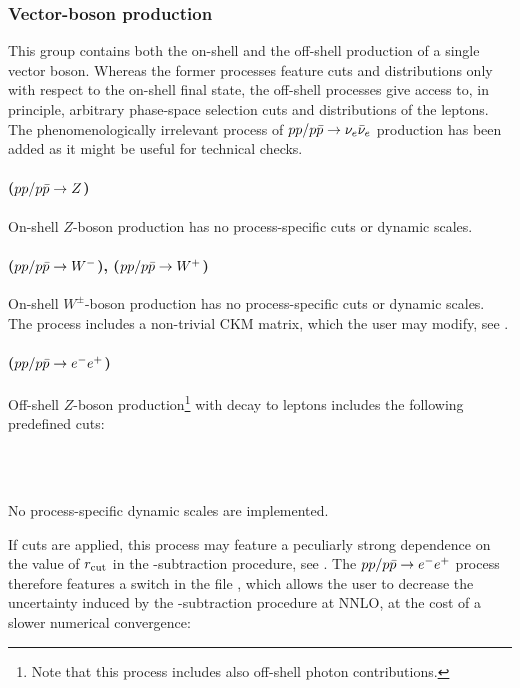 \documentclass[english,11pt]{article}
\begin{document}
\subsubsection{Vector-boson production}\label{sec:vectorbosonprocesses}

This group contains both the on-shell and the off-shell production of a single vector boson. 
Whereas the former processes feature cuts and distributions only with respect to the on-shell final state, 
the off-shell processes give access to, in principle, arbitrary phase-space selection cuts and distributions of the leptons. 
The phenomenologically irrelevant process of $pp/p\bar{p}\to\nu_e\bar\nu_e$ production has been added as it might be useful for technical checks.

\paragraph{ ($pp/p\bar{p}\to Z$)}
On-shell $Z$-boson production has no process-specific cuts or dynamic scales.

\paragraph{ ($pp/p\bar{p}\to W^-$),  ($pp/p\bar{p}\to W^+$)}
On-shell $W^\pm$-boson production has no process-specific cuts or dynamic scales. The process includes a non-trivial CKM matrix, 
which the user may modify, see .

\paragraph{ ($pp/p\bar{p}\to e^-e^+$)}\label{sec:ppeex02}
Off-shell $Z$-boson production\footnote{Note that this process includes also off-shell photon contributions.} with decay to leptons includes the following predefined cuts:

\\
\\

No process-specific dynamic scales are implemented.

If cuts are applied, this process may feature
a peculiarly strong dependence on the value of $r_{\mathrm{cut}}{}$ in the \qt{}-subtraction procedure, see . 
The $pp/p\bar{p}\to e^-e^+$ process therefore features a switch
 in the file , which allows the user to decrease the uncertainty induced by the \qt{}-subtraction procedure at NNLO, at the cost of a slower numerical convergence:
\end{document}
